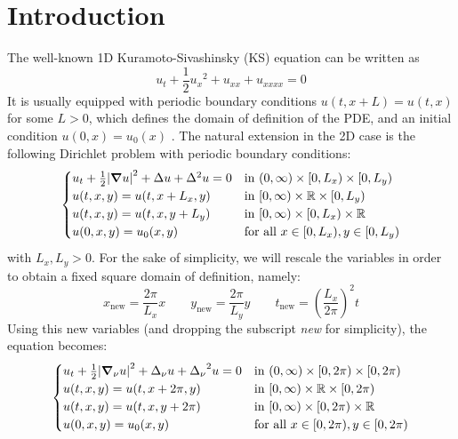 \documentclass[twoside]{article}
\begin{document}
\section{Introduction}\label{sec:intro}
The well-known 1D Kuramoto-Sivashinsky (KS) equation can be written as
\begin{equation}
  u_t + \frac{1}{2} {u_x}^2 + u_{xx} + u_{xxxx} = 0
\end{equation}
It is usually equipped with periodic boundary conditions $u(t, x + L) = u(t, x)$ for some $L > 0$, which defines the domain of definition of the PDE, and an initial condition $u(0, x) = u_0(x)$ \cite{1d-ks}. The natural extension in the 2D case is the following Dirichlet problem with periodic boundary conditions:
\begin{equation}
  \begin{cases}
    u_t + \frac{1}{2} \abs{\grad u}^2 + \Delta u + \Delta^2 u = 0 & \text{in } (0, \infty) \times [0, L_x) \times [0, L_y) \\
    u(t, x, y) = u(t, x + L_x, y)                                         & \text{in } [0, \infty) \times \mathbb{R} \times [0, L_y)      \\
    u(t, x, y) = u(t, x, y + L_y)                                         & \text{in } [0, \infty) \times [0, L_x) \times \mathbb{R}      \\
    u(0, x, y) = u_0(x, y)                                                & \text{for all } x \in [0, L_x), y \in [0, L_y)
  \end{cases}
\end{equation}
with $L_x, L_y > 0$. For the sake of simplicity, we will rescale the variables in order to obtain a fixed square domain of definition, namely:
\begin{equation}
  x_\mathrm{new} = \frac{2\pi}{L_x} x \qquad y_\mathrm{new} = \frac{2\pi}{L_y} y \qquad t_\mathrm{new} = {\left(\frac{L_x}{2 \pi}\right)}^2 t
\end{equation}
Using this new variables (and dropping the subscript \emph{new} for simplicity), the equation becomes:
\begin{equation}\label{eq:2d_ks}
  \begin{cases}
    u_t + \frac{1}{2} \abs{\grad_\nu u}^2 + \Delta_\nu u + {\Delta_\nu}^2 u = 0 & \text{in } (0, \infty) \times [0, 2\pi) \times [0, 2\pi) \\
    u(t, x, y) = u(t, x + 2\pi, y)                                                      & \text{in } [0, \infty) \times \mathbb{R} \times [0, 2\pi)       \\
    u(t, x, y) = u(t, x, y + 2\pi)                                                      & \text{in } [0, \infty) \times [0, 2\pi) \times \mathbb{R}       \\
    u(0, x, y) = u_0(x, y)                                                              & \text{for all } x \in [0, 2\pi), y \in [0, 2\pi)
  \end{cases}
\end{equation}
\end{document}
